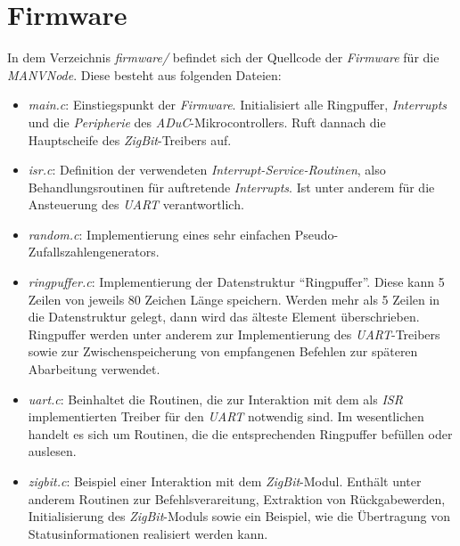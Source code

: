     \section{Firmware}

    In dem Verzeichnis \emph{firmware/} befindet sich der Quellcode der \emph{Firmware} für die \emph{MANVNode}.
    Diese besteht aus folgenden Dateien:

    \begin{itemize}
        \item{\emph{main.c}:} Einstiegspunkt der \emph{Firmware}. Initialisiert alle Ringpuffer, \emph{Interrupts} und 
                       die \emph{Peripherie} des \emph{ADuC}-Mikrocontrollers. Ruft dannach die 
                       Hauptscheife des \emph{ZigBit}-Treibers auf.
        \item{\emph{isr.c}:}  Definition der verwendeten \emph{Interrupt-Service-Routinen}, also Behandlungsroutinen
                       für auftretende \emph{Interrupts}. Ist unter anderem für die Ansteuerung des \emph{UART} 
                       verantwortlich.
        \item{\emph{random.c}:} Implementierung eines sehr einfachen Pseudo-Zufallszahlengenerators.
        \item{\emph{ringpuffer.c}:} Implementierung der Datenstruktur "`Ringpuffer"'. Diese kann 5 Zeilen
                             von jeweils 80 Zeichen Länge speichern. Werden mehr als 5 Zeilen in die
                             Datenstruktur gelegt, dann wird das älteste Element überschrieben.
                             Ringpuffer werden unter anderem zur Implementierung des \emph{UART}-Treibers
                             sowie zur Zwischenspeicherung von empfangenen Befehlen zur späteren
                             Abarbeitung verwendet.
        \item{\emph{uart.c}:} Beinhaltet die Routinen, die zur Interaktion mit dem als \emph{ISR} implementierten
                       Treiber für den \emph{UART} notwendig sind. Im wesentlichen handelt es sich um 
                       Routinen, die die entsprechenden Ringpuffer befüllen oder auslesen.
        \item{\emph{zigbit.c}:} Beispiel einer Interaktion mit dem \emph{ZigBit}-Modul. Enthält unter anderem Routinen
                         zur Befehlsverareitung, Extraktion von Rückgabewerden, Initialisierung des \emph{ZigBit}-Moduls
                         sowie ein Beispiel, wie die Übertragung von Statusinformationen realisiert werden kann.
    \end{itemize}

